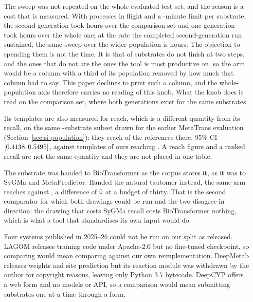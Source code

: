 \documentclass[journal=jcisd8,manuscript=suppinfo,layout=onecolumn]{achemso}
\begin{document}
The sweep was not repeated on the whole evaluated test set, and the reason is a cost that is
measured. With \numBtstepsCostWorkers{} processes in flight and a
\numBtstepsCostTimeoutmin{}-minute limit per substrate, the second generation took
\numBtstepsCostTwohours{} hours over the comparison set and one generation took
\numBtstepsCostOnehours{} hours over the whole one; at the rate the completed second-generation
run sustained, the same sweep over the wider population is \numBtstepsCostProjected{} hours. The
objection to spending them is not the time. It is that
\numBtstepsLost{} of \numBtstepsAttempted{} substrates do not finish at two steps, and the ones
that do not are the ones the tool is most productive on, so the arm would be a column with a
third of its population removed by how much that column had to say. This paper declines to print
such a column, and the whole-population axis therefore carries no reading of this knob. What the
knob does is read on the comparison set, where both generations exist for the same substrates.

Its templates are also measured for reach, which is a different quantity from its recall, on the
same \numBtN{}-substrate subset drawn for the earlier MetaTrans evaluation
(Section~\ref{sec:si-population}): they reach \numBtReach{} of the
references there, 95\% CI $[0.4138, 0.5495]$, against \numBankRules{} templates of ours
reaching \numBtOurreach{}. A reach figure and a ranked recall are not the same quantity and they
are not placed in one table.

The substrate was handed to BioTransformer as the corpus stores it, as it was to SyGMa and
MetaPredictor. Handed the natural tautomer instead, the same arm reaches
\numBtarmDrawnrecallThreeZero{} against \numBtarmRecallThreeZero{}, a difference of
$0$ at a budget of thirty. That is the second comparator for which both
drawings could be run and the two disagree in direction: the drawing that costs SyGMa recall costs
BioTransformer nothing, which is what a tool that standardises its own input would do.

Four systems published in 2025--26 could not be run on our split as released. LAGOM
\citep{Larsson_2025} releases training code under Apache-2.0 but no fine-tuned checkpoint, so
comparing would mean comparing against our own reimplementation. DeepMetab \citep{Zhou_2025}
releases weights and site prediction but its reaction module was withdrawn by the author for
copyright reasons, leaving only Python 3.7 bytecode. DeepCYP \citep{Zhou_2026} offers a web form
and no models or API, so a comparison would mean submitting substrates one at a time through a
form.
\end{document}
